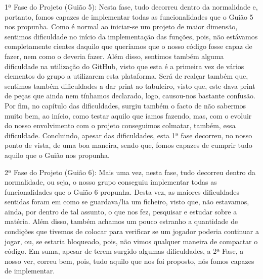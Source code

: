 1ª Fase do Projeto (Guião 5)\+: Nesta fase, tudo decorreu dentro da normalidade e, portanto, fomos capazes de implementar todas as funcionalidades que o Guião 5 nos propunha. Como é normal ao iniciar-\/se um projeto de maior dimensão, sentimos dificuldade no início da implementação das funções, pois, não estávamos completamente cientes daquilo que queríamos que o nosso código fosse capaz de fazer, nem como o deveria fazer. Além disso, sentimos também alguma dificuldade na utilização do Git\+Hub, visto que esta é a primeira vez de vários elementos do grupo a utilizarem esta plataforma. Será de realçar também que, sentimos também dificuldades a dar print ao tabuleiro, visto que, este dava print de peças que ainda nem tínhamos declarado, logo, causou-\/nos bastante confusão. Por fim, no capítulo das dificuldades, surgiu também o facto de não sabermos muito bem, ao início, como testar aquilo que íamos fazendo, mas, com o evoluir do nosso envolvimento com o projeto conseguimos colmatar, também, essa dificuldade. Concluindo, apesar das dificuldades, esta 1ª fase decorreu, no nosso ponto de vista, de uma boa maneira, sendo que, fomos capazes de cumprir tudo aquilo que o Guião nos propunha.

2ª Fase do Projeto (Guião 6)\+: Mais uma vez, nesta fase, tudo decorreu dentro da normalidade, ou seja, o nosso grupo conseguiu implementar todas as funcionalidades que o Guião 6 propunha. Desta vez, as maiores dificuldades sentidas foram em como se guardava/lia um ficheiro, visto que, não estavamos, ainda, por dentro de tal assunto, o que nos fez, pesquisar e estudar sobre a matéria. Além disso, também achamos um pouco estranho a quantidade de condições que tivemos de colocar para verificar se um jogador poderia continuar a jogar, ou, se estaria bloqueado, pois, não vimos qualquer maneira de compactar o código. Em suma, apesar de terem surgido algumas dificuldades, a 2ª Fase, a nosso ver, correu bem, pois, tudo aquilo que nos foi proposto, nós fomos capazes de implementar. 